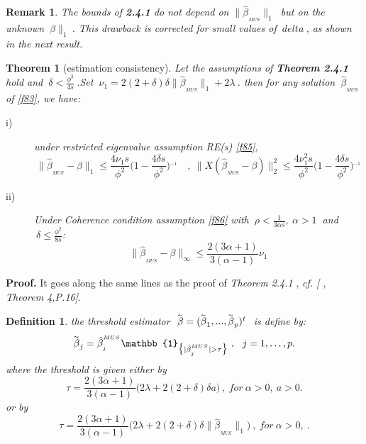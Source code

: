 \documentclass[12pt]{report}
\newtheorem{theoreme}{Theorem}[section] %
\newtheorem {definition}{Definition}[section] %
\newtheorem{remarque}{Remark}[section]
\begin{document}
\begin{remarque}
	The bounds of \textbf{2.4.1} do not depend on $\parallel \hat{\beta}_{_{MUS}}\parallel_{1}\ $ but on the unknown $\ \beta \parallel_{1}\ $. This drawback is corrected for small values of $\ delta\ $, as shown in the next result.
\end{remarque}
\begin{theoreme}[estimation consistency]
	Let the assumptions of \textbf{Theorem 2.4.1} hold and $\ \delta<\frac{\phi^{2}}{4s}\ $.Set $\ \nu_{1}=2(2+\delta)\delta\parallel  \hat{\beta}_{_{MUS}}\parallel_{1}+2\lambda\ $. then for any solution $\  \hat{\beta}_{_{MUS}}\ $ of \eqref{f83}, we have:
		\begin{description}
		\item[i)] under restricted eigenvalue assumption RE(s) \eqref{f85},
		\begin{equation}
			\parallel\hat{\beta}_{_{MUS}}-\beta \parallel_{1}\leq\frac{4\nu_{1} s}{\phi^{2}}\bigg(1-\frac{4\delta s}{\phi^{2}}\bigg)^{_{-1}}\quad ,\ 	\parallel X(\hat{\beta}_{_{MUS}}-\beta )\parallel_{2}^{2}\leq\frac{4\nu^{2}_{1} s}{\phi^{2}}\bigg(1-\frac{4\delta s}{\phi^{2}}\bigg)^{_{-1}}
		\end{equation}
		\item[ii)] Under Coherence condition assumption \eqref{f86} with $\ \rho<\frac{1}{3\alpha s},\ \alpha>1\ $ and $\ \delta\leq \frac{\phi^{2}}{8s}$:
		\begin{equation}
			\parallel\hat{\beta}_{_{MUS}}-\beta \parallel_{\infty}\leq\frac{2(3\alpha +1)}{3(\alpha-1)}\nu_{1}
		\end{equation}
	\end{description}
\end{theoreme}
\textbf{Proof.} It goes along the same lines as the proof of  \textit{Theorem 2.4.1} , \textit{cf. [ \cite{nref23}, Theorem 4,P.16]}.\\
\begin{definition}
	the threshold estimator $\ \overset{_{\thicksim}}{\beta}=(\overset{_{\thicksim}}{\beta}_{1},...,\overset{_{\thicksim}}{\beta}_{p})^{t}\ $ is define by:
	\begin{equation}
		\overset{_{\thicksim}}{\beta}_{j}=\hat{\beta}_{_{j}}^{^{MUS}}\mathbb{1}_{\big\{|\hat{\beta}_{_{j}}^{^{MUS}}|>\tau\big\}}\ ,\ \ j=1,\dots,p.
		\label{f89}
	\end{equation}
where the threshold is given either by 
\begin{equation}
	\tau=\frac{2(3\alpha +1)}{3(\alpha-1)}\big(2\lambda+2(2+\delta)\delta a\big)\ , \ for\ \alpha>0,\ a>0.
	\label{f90}
\end{equation}
or by
\begin{equation}
	\tau=\frac{2(3\alpha +1)}{3(\alpha-1)}\big(2\lambda+2(2+\delta)\delta \parallel\hat{\beta}_{_{MUS}}\parallel_{1}\big)\ , \ for\ \alpha>0,\ .
	\label{f91}
\end{equation}
\end{definition}
\end{document}
